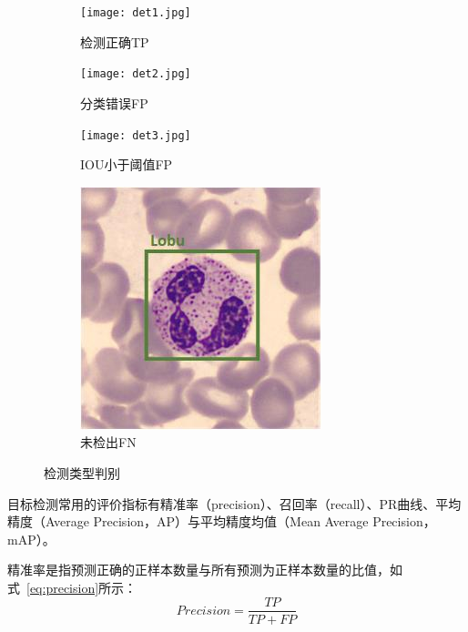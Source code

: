 \begin{figure}[htbp]
	\centering
  \begin{subfigure}{0.24\linewidth}
    \centering
    \texttt{[image: det1.jpg]}
    \caption{检测正确TP}
  \end{subfigure}
	\centering
	\begin{subfigure}{0.24\linewidth}
		\centering
		\texttt{[image: det2.jpg]}
    \caption{分类错误FP}
	\end{subfigure}
	\centering
	\begin{subfigure}{0.24\linewidth}
		\centering
		\texttt{[image: det3.jpg]}
    \caption{IOU小于阈值FP}
	\end{subfigure}
	\centering
	\begin{subfigure}{0.24\linewidth}
		\centering
		\includegraphics[width=0.95\linewidth, height=0.95\linewidth]{det4.jpg}
    \caption{未检出FN}
	\end{subfigure}
	\caption{检测类型判别}
	\label{fig:confusion}
\end{figure}

目标检测常用的评价指标有精准率（precision）、召回率（recall）、PR曲线、平均精度（Average Precision，AP）与平均精度均值（Mean Average Precision，mAP）。

精准率是指预测正确的正样本数量与所有预测为正样本数量的比值，如式~\ref{eq:precision}所示：
\begin{equation}               
  Precision = \frac{TP}{TP + FP}
  \label{eq:precision}     
\end{equation} 

